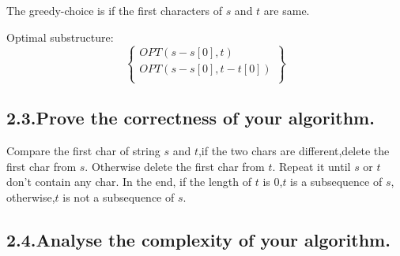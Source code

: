 \documentclass[10pt]{article}
\begin{document}
\noindent{}The greedy-choice is if the first characters of $s$ and $t$ are same.%

Optimal substructure:\hspace*{1em}\hspace*{1em}\hspace*{1em}\hspace*{1em}\hspace*{1em}\hspace*{1em}\hspace*{1em}\hspace*{1em}
\[\begin{Bmatrix}
  OPT(s-s[0],t) \\
  OPT(s-s[0],t-t[0])\\
\end{Bmatrix}
\]%

\subsection{2.3.\hspace*{0.5em}Prove the correctness of your algorithm.}\label{sec-prove-the-correctness-of-your-algorithm}%

\noindent{}\hspace*{1em}Compare the first char of string $s$ and $t$,if the two chars are different,delete the first char from
$s$. Otherwise delete the first char from $t$. Repeat it until $s$ or $t$ don't contain any char. In the end,
if the length of $t$ is 0,$t$ is a subsequence of $s$, otherwise,$t$ is not a subsequence of $s$.%

\subsection{2.4.\hspace*{0.5em}Analyse the complexity of your algorithm.}\label{sec-analyse-the-complexity-of-your-algorithm}%
\end{document}

